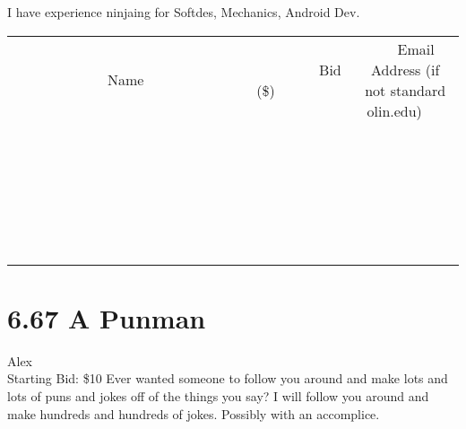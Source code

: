 \documentclass[11pt]{article}
\begin{document}
I have experience ninjaing for Softdes, Mechanics, Android Dev.
\\[6ex]
\begin{tabular}{c c c}
~~~~~~~~~~~~~Name~~~~~~~~~~~~~ & ~~~~~~~~~Bid (\$)~~~~~~~~~  & ~~~Email Address (if not standard olin.edu)~~~\\
 & & \\
\hline
 & & \\
\hline
 & & \\
\hline
 & & \\
\hline
 & & \\
\hline
 & & \\
\hline
 & & \\
\hline
 & & \\
\hline
 & & \\
\hline
 & & \\
\hline
 & & \\
\hline
 & & \\
\hline
 & & \\
\hline
 & & \\
\hline
 & & \\
\hline
 & & \\
\hline
 & & \\
\hline
 & & \\
\hline
 & & \\
\hline
 & & \\
\hline
 & & \\
\hline
 & & \\
\hline
 & & \\
\hline
 & & \\
\hline
 & & \\
\hline
 & & \\
\hline
\end{tabular}
\newpage
\section*{6.67 A Punman}
Alex
\\
Starting Bid: \$10
\newline
Ever wanted someone to follow you around and make lots and lots of puns and jokes off of the things you say? I will follow you around and make hundreds and hundreds of jokes. Possibly with an accomplice. 
\end{document}

